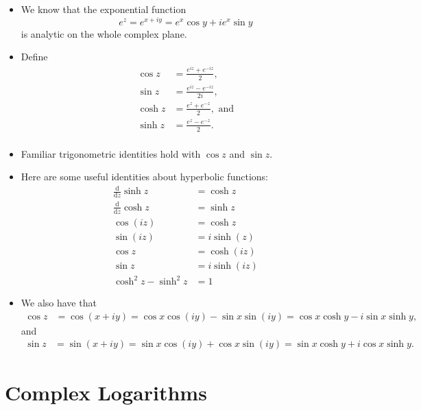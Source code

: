 \documentclass[10pt]{article}
\newcommand{\dee}{\mathrm{d}}
\begin{document}
  \begin{itemize}
    \item We know that the exponential function $$e^z = e^{x + iy} = e^x \cos y + i e^x \sin y$$ is analytic on the whole complex plane.

    \item Define
    \begin{align*}
      \cos z &= \frac{e^{iz} + e^{-iz}}{2},\\
      \sin z &= \frac{e^{iz} - e^{-iz}}{2i},\\
      \cosh z &= \frac{e^z + e^{-z}}{2}, \mbox{ and}\\
      \sinh z &= \frac{e^z - e^{-z}}{2}.\\
    \end{align*}

    \item Familiar trigonometric identities hold with $\cos z$ and $\sin z$.

    \item Here are some useful identities about hyperbolic functions:
    \begin{align*}
      \frac{\dee}{\dee z} \sinh z &= \cosh z\\
      \frac{\dee}{\dee z} \cosh z &= \sinh z\\
      \cos(iz) &= \cosh z\\
      \sin(iz) &= i \sinh(z)\\
      \cos z &= \cosh (iz)\\
      \sin z &= i\sinh (iz)\\
      \cosh^2 z - \sinh^2 z &= 1
     \end{align*}

     \item We also have that
     \begin{align*}
       \cos z &= \cos (x+iy) = \cos x \cos(iy) - \sin x \sin(iy) = \cos x \cosh y - i \sin x \sinh y,
     \end{align*}
     and
     \begin{align*}
       \sin z &= \sin (x + iy) = \sin x \cos (iy) + \cos x \sin(iy)
       = \sin x \cosh y + i \cos x \sinh y.
     \end{align*}    
  \end{itemize}  

  \section{Complex Logarithms} %
  \label{sec:complex_logarithms}
\end{document}
